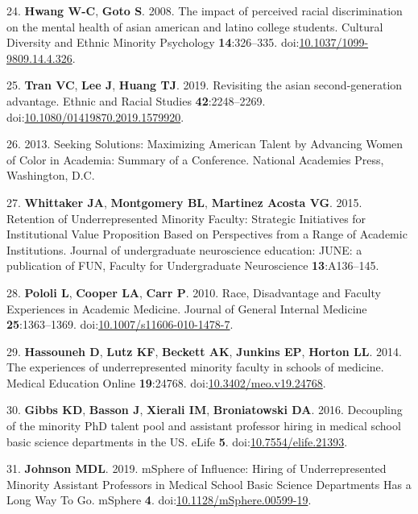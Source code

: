 \documentclass[10pt,]{article}
\begin{document}
\hypertarget{ref-Hwang2008}{}
24. \textbf{Hwang W-C}, \textbf{Goto S}. 2008. The impact of perceived
racial discrimination on the mental health of asian american and latino
college students. Cultural Diversity and Ethnic Minority Psychology
\textbf{14}:326--335.
doi:\href{https://doi.org/10.1037/1099-9809.14.4.326}{10.1037/1099-9809.14.4.326}.

\hypertarget{ref-Tran2019}{}
25. \textbf{Tran VC}, \textbf{Lee J}, \textbf{Huang TJ}. 2019.
Revisiting the asian second-generation advantage. Ethnic and Racial
Studies \textbf{42}:2248--2269.
doi:\href{https://doi.org/10.1080/01419870.2019.1579920}{10.1080/01419870.2019.1579920}.

\hypertarget{ref-noauthor_seeking_2013}{}
26. 2013. Seeking Solutions: Maximizing American Talent by Advancing
Women of Color in Academia: Summary of a Conference. National Academies
Press, Washington, D.C.

\hypertarget{ref-whittaker_retention_2015}{}
27. \textbf{Whittaker JA}, \textbf{Montgomery BL}, \textbf{Martinez
Acosta VG}. 2015. Retention of Underrepresented Minority Faculty:
Strategic Initiatives for Institutional Value Proposition Based on
Perspectives from a Range of Academic Institutions. Journal of
undergraduate neuroscience education: JUNE: a publication of FUN,
Faculty for Undergraduate Neuroscience \textbf{13}:A136--145.

\hypertarget{ref-pololi_race_2010}{}
28. \textbf{Pololi L}, \textbf{Cooper LA}, \textbf{Carr P}. 2010. Race,
Disadvantage and Faculty Experiences in Academic Medicine. Journal of
General Internal Medicine \textbf{25}:1363--1369.
doi:\href{https://doi.org/10.1007/s11606-010-1478-7}{10.1007/s11606-010-1478-7}.

\hypertarget{ref-hassouneh_experiences_2014}{}
29. \textbf{Hassouneh D}, \textbf{Lutz KF}, \textbf{Beckett AK},
\textbf{Junkins EP}, \textbf{Horton LL}. 2014. The experiences of
underrepresented minority faculty in schools of medicine. Medical
Education Online \textbf{19}:24768.
doi:\href{https://doi.org/10.3402/meo.v19.24768}{10.3402/meo.v19.24768}.

\hypertarget{ref-Gibbs2016}{}
30. \textbf{Gibbs KD}, \textbf{Basson J}, \textbf{Xierali IM},
\textbf{Broniatowski DA}. 2016. Decoupling of the minority PhD talent
pool and assistant professor hiring in medical school basic science
departments in the US. eLife \textbf{5}.
doi:\href{https://doi.org/10.7554/elife.21393}{10.7554/elife.21393}.

\hypertarget{ref-johnson_msphere_2019}{}
31. \textbf{Johnson MDL}. 2019. mSphere of Influence: Hiring of
Underrepresented Minority Assistant Professors in Medical School Basic
Science Departments Has a Long Way To Go. mSphere \textbf{4}.
doi:\href{https://doi.org/10.1128/mSphere.00599-19}{10.1128/mSphere.00599-19}.
\end{document}
